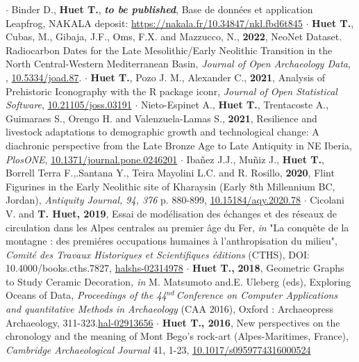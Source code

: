 \documentclass{article}
\begin{document}
\smallbreak
$\cdot$ Binder D., \textbf{Huet T.}, \textit{\textbf{to be published}}, Base de données et application Leapfrog, NAKALA deposit: \href{https://nakala.fr/10.34847/nkl.fbd6t845}{https://nakala.fr/10.34847/nkl.fbd6t845}
\smallbreak
$\cdot$ \textbf{Huet T.}, Cubas, M., Gibaja, J.F., Oms, F.X. and Mazzucco, N., \textbf{2022}, NeoNet Dataset. Radiocarbon Dates for the Late Mesolithic/Early Neolithic Transition in the North Central-Western Mediterranean Basin, \textit{Journal of Open Archaeology Data}, , \href{http://doi.org/10.5334/joad.87}{10.5334/joad.87}.
\smallbreak
$\cdot$ \textbf{Huet T.}, Pozo J. M., Alexander C., \textbf{2021}, Analysis of Prehistoric Iconography with the R package iconr, \textit{Journal of Open Statistical Software}, \href{https://joss.theoj.org/papers/10.21105/joss.03191}{10.21105/joss.03191}
\smallbreak
$\cdot$ Nieto-Espinet A., \textbf{Huet T.}, Trentacoste A., Guimaraes S., Orengo H. and Valenzuela-Lamas S., \textbf{2021}, Resilience and livestock adaptations to demographic growth and technological change: A diachronic perspective from the Late Bronze Age to Late Antiquity in NE Iberia, \textit{PlosONE}, \href{https://doi.org/10.1371/journal.pone.0246201}{10.1371/journal.pone.0246201}
\smallbreak
$\cdot$ Iba\~{n}ez J.J., Mu\~{n}iz J., \textbf{Huet T.}, Borrell Terra F.,.Santana Y., Teira Mayolini L.C. and R. Rosillo, \textbf{2020}, Flint Figurines in the Early Neolithic site of Kharaysin (Early 8th Millennium BC, Jordan), \textit{Antiquity Journal, 94, 376} p. 880-899, \href{https://doi.org/10.15184/aqy.2020.78}{10.15184/aqy.2020.78}
\smallbreak
$\cdot$ Cicolani V. and \textbf{T. Huet, 2019}, Essai de mod\'{e}lisation des \'{e}changes et des r\'{e}seaux de circulation dans les Alpes centrales au premier \^{a}ge du Fer, \textit{in} "La conqu\^{e}te de la montagne : des premi\'{e}res occupations humaines \`{a} l'anthropisation du milieu", \textit{Comit\'{e} des Travaux Historiques et Scientifiques \'{e}ditions} (CTHS), DOI: 10.4000/books.cths.7827, \href{https://halshs.archives-ouvertes.fr/halshs-02314978/document}{halshs-02314978}
\smallbreak
$\cdot$ \textbf{Huet T.,} \textbf{2018}, Geometric Graphs to Study Ceramic Decoration\textit{, in} M. Matsumoto and.E. Uleberg (eds), Exploring Oceans of Data, \textit{Proceedings of the 44${}^{nd\ }$Conference on Computer Applications and quantitative Methods in Archaeology} (CAA 2016), Oxford : Archaeopress Archaeology, 311-323.\href{https://hal.archives-ouvertes.fr/hal-02913656}{hal-02913656}
\smallbreak
$\cdot$ \textbf{Huet T., 2016}, New perspectives on the chronology and the meaning of Mont Bego's rock-art (Alpes-Maritimes, France), \textit{Cambridge Archaeological Journal} 41, 1-23, \href{https://doi.org/10.1017/s0959774316000524}{10.1017/s0959774316000524}
\end{document}
